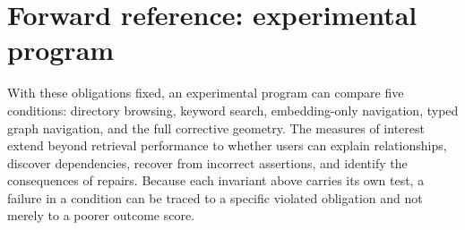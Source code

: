 \documentclass[11pt]{article}
\theoremstyle{definition}
\begin{document}
\section{Forward reference: experimental program}

With these obligations fixed, an experimental program can compare five conditions: directory browsing, keyword search, embedding-only navigation, typed graph navigation, and the full corrective geometry. The measures of interest extend beyond retrieval performance to whether users can explain relationships, discover dependencies, recover from incorrect assertions, and identify the consequences of repairs. Because each invariant above carries its own test, a failure in a condition can be traced to a specific violated obligation and not merely to a poorer outcome score.
\end{document}
